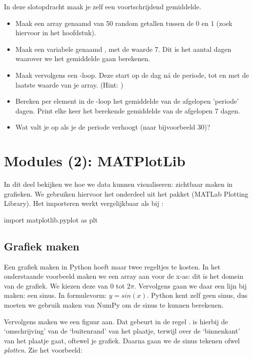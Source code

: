 \documentclass[a4paper,11pt, fleqn]{article}
\newcommand{\ditwc}{Naam van het huidige werkcollege}
\begin{document}
In deze slotopdracht maak je zelf een voortschrijdend gemiddelde.

\begin{itemize}
	\item Maak een array genaamd  van 50 random getallen tussen de 0 en 1 (zoek hiervoor in het hoofdstuk).
	\item Maak een variabele genaamd , met de waarde 7. Dit is het aantal dagen waarover we het gemiddelde gaan berekenen.
	\item Maak vervolgens een -loop. Deze start op de dag n\'a de periode, tot en met de laatste waarde van je array. (Hint: )
	\item Bereken per element in de -loop het gemiddelde van de afgelopen 'periode' dagen. Print elke keer het berekende gemiddelde van de afgelopen 7 dagen.
	\item Wat valt je op als je de periode verhoogt (naar bijvoorbeeld 30)?
\end{itemize}

\clearpage
\renewcommand{\ditwc}{Modules(2): MATPlotLib}
\section{Modules (2): MATPlotLib}
In dit deel bekijken we hoe we data kunnen visualiseren: zichtbaar maken in grafieken. We gebruiken hiervoor het  onderdeel uit het pakket  (MATLab Plotting Library). Het importeren werkt vergelijkbaar als bij :
\begin{python}
import matplotlib.pyplot as plt
\end{python}

\subsection{Grafiek maken}
Een grafiek maken in Python hoeft maar twee regeltjes te kosten. In het onderstaande voorbeeld maken we een array aan voor de x-as: dit is het domein van de grafiek. We kiezen deze van $0$ tot $2\pi$. Vervolgens gaan we daar een lijn bij maken: een sinus. In formulevorm: $y = sin(x)$. Python kent zelf geen sinus, dus moeten we gebruik maken van NumPy om de sinus te kunnen berekenen.

Vervolgens maken we een figuur aan. Dat gebeurt in de regel .  is hierbij de `omschrijving' van de `buitenrand' van het plaatje, terwijl  over de `binnenkant' van het plaatje gaat, oftewel je grafiek. Daarna gaan we de sinus tekenen ofwel {\it plotten}. Zie het voorbeeld:
\end{document}
